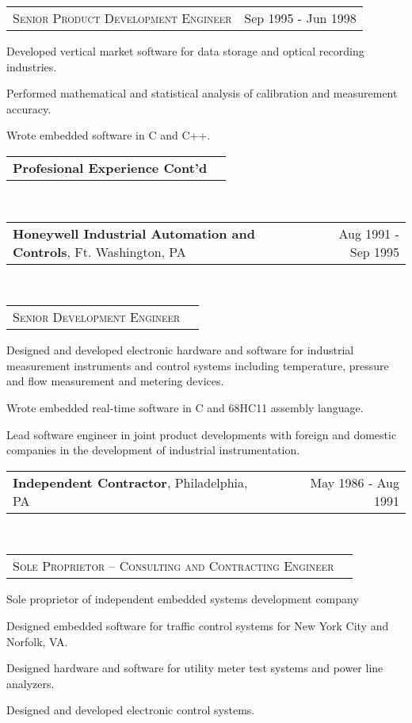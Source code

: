 \documentclass[10pt,letterpaper]{extarticle}
\makeatletter
\newcommand{\headerrow}[2]
{\begin{tabular*}{\linewidth}{l@{\extracolsep{\fill}}r}
	#1 &
	#2 \\
\end{tabular*}}
\makeatother
\begin{document}
	\headerrow
	{\large \textsc{Senior Product Development Engineer}}
	{Sep 1995 - Jun 1998}\vspace{-\topsep}\begin{itemize*}
	\item Developed vertical market software for data storage and optical recording industries.
	\item Performed mathematical and statistical analysis of calibration and measurement accuracy.
	\item Wrote embedded software in C and C++.
	\end{itemize*}\vspace{-\topsep}
\clearpage
\fancyhead[CO,CE]{\LARGE \textcolor[gray]{0.7}{Peter J. Pupalaikis}}
	\headerrow
	{\large \textbf{Profesional Experience Cont'd}}
	{}\\
	\headerrow
		{\large \textbf{Honeywell Industrial Automation and Controls}, Ft. Washington, PA}
		{Aug 1991 - Sep 1995}
	\\
	\headerrow
		{\large \textsc{Senior Development Engineer}}
		{}
	\vspace{-2em}\begin{itemize*}
		\item Designed and developed electronic hardware and software for industrial
		measurement instruments and control systems including temperature, pressure and flow
		measurement and metering devices.
		\item Wrote embedded real-time software in C and 68HC11 assembly language.
		\item Lead software engineer in joint product developments with foreign and domestic
		companies in the development of industrial instrumentation.
	\end{itemize*}
	\headerrow
		{\large \textbf{Independent Contractor}, Philadelphia, PA}
		{May 1986 - Aug 1991}
	\\
	\headerrow
		{\large \textsc{Sole Proprietor – Consulting and Contracting Engineer}}
		{}
	\vspace{-2em}\begin{itemize*}
	 \item Sole proprietor of independent embedded systems development company
	 \item Designed embedded software for traffic control systems for New York City and
	 Norfolk, VA.
	 \item Designed hardware and software for utility meter test systems and power line
	 analyzers.
	 \item Designed and developed electronic control systems.
	\end{itemize*}
\end{document}
